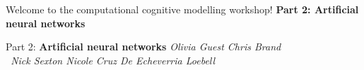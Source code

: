 \documentclass{beamer}
\begin{document}
\begin{frame}
% 
\centering\Huge Welcome to the computational cognitive modelling workshop! 
\vfill \huge
\centering\textbf{Part 2: Artificial neural networks} \normalsize
\vfill
\end{frame}

\begin{frame}
% 
\vfill \Huge
\centering Part 2: \textbf{Artificial neural networks} \large
\vfill
\textit{
Olivia Guest \hfill  Chris Brand 
\vspace{0.5cm} \\ \ 
Nick Sexton \hfill Nicole Cruz De Echeverria Loebell } 
\end{frame}
\end{document}
